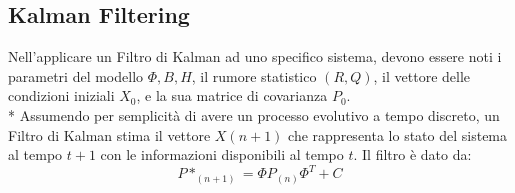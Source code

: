 \subsection{Kalman Filtering}
Nell'applicare un Filtro di Kalman ad uno specifico sistema, devono essere noti i parametri del modello $\Phi,B,H$, il rumore statistico $(R,Q)$, il vettore delle condizioni iniziali $X_0$, e la sua matrice di covarianza $P_0$.\\*
Assumendo per semplicit\`a di avere un processo evolutivo a tempo discreto,
un Filtro di Kalman stima il vettore $X(n+1)$ che rappresenta lo stato del sistema al tempo $t+1$ con le informazioni disponibili al tempo $t$. Il filtro \`e dato da:
$$
P*_(n+1) = \Phi P_(n)\Phi^T + C
$$